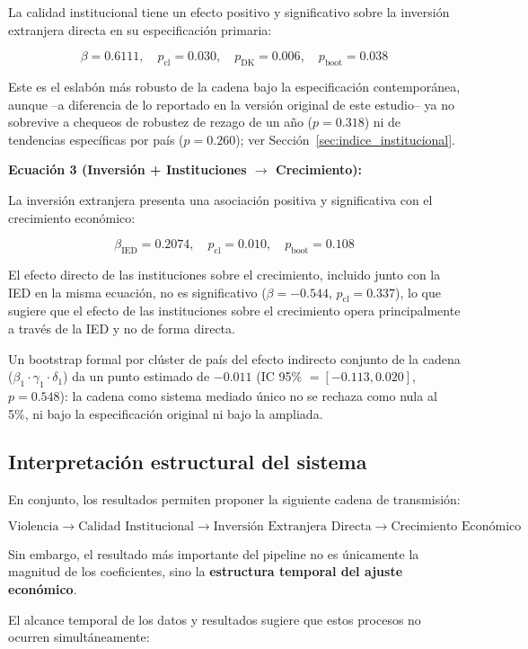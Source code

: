 \documentclass[11pt,a4paper]{article}
\begin{document}
La calidad institucional tiene un efecto positivo y significativo sobre la inversión extranjera directa en su especificación primaria:

\[
\beta = 0.6111, \quad p_{\text{cl}} = 0.030, \quad p_{\text{DK}} = 0.006, \quad p_{\text{boot}} = 0.038
\]

Este es el eslabón más robusto de la cadena bajo la especificación contemporánea, aunque --a diferencia de lo reportado en la versión original de este estudio-- ya no sobrevive a chequeos de robustez de rezago de un año ($p=0.318$) ni de tendencias específicas por país ($p=0.260$); ver Sección~\ref{sec:indice_institucional}.

\textbf{Ecuación 3 (Inversión + Instituciones $\rightarrow$ Crecimiento):}

La inversión extranjera presenta una asociación positiva y significativa con el crecimiento económico:

\[
\beta_{\text{IED}} = 0.2074, \quad p_{\text{cl}} = 0.010, \quad p_{\text{boot}} = 0.108
\]

El efecto directo de las instituciones sobre el crecimiento, incluido junto con la IED en la misma ecuación, no es significativo ($\beta=-0.544$, $p_{\text{cl}}=0.337$), lo que sugiere que el efecto de las instituciones sobre el crecimiento opera principalmente a través de la IED y no de forma directa.

Un bootstrap formal por clúster de país del efecto indirecto conjunto de la cadena ($\beta_1 \cdot \gamma_1 \cdot \delta_1$) da un punto estimado de $-0.011$ (IC 95\% $=[-0.113, 0.020]$, $p=0.548$): la cadena como sistema mediado único no se rechaza como nula al 5\%, ni bajo la especificación original ni bajo la ampliada.

\subsection{Interpretación estructural del sistema}

En conjunto, los resultados permiten proponer la siguiente cadena de transmisión:

\[
\text{Violencia}
\longrightarrow
\text{Calidad Institucional}
\longrightarrow
\text{Inversión Extranjera Directa}
\longrightarrow
\text{Crecimiento Económico}
\]

Sin embargo, el resultado más importante del pipeline no es únicamente la magnitud de los coeficientes, sino la \textbf{estructura temporal del ajuste económico}.

El alcance temporal de los datos y resultados sugiere que estos procesos no ocurren simultáneamente:
\end{document}
